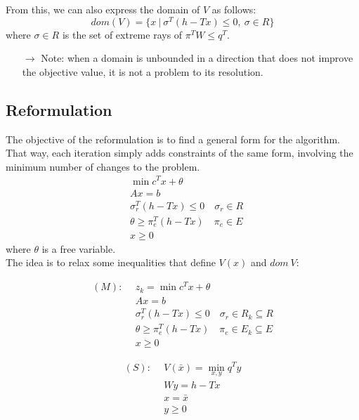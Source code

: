 \documentclass[12pt, openany]{report}
\theoremstyle{definition}
\begin{document}
From this, we can also express the domain of $V$ as follows:
\begin{equation}
	dom(V) = \{x\ |\ \sigma^T(h-Tx)\le 0,\ \sigma\in R\}
\end{equation}
where $\sigma\in R$ is the set of extreme rays of $\pi^TW\le q^T$.
\begin{itemize}
	\item [$\to$] Note: when a domain is unbounded in a direction that does not improve the objective value, it is not a problem to its resolution.
\end{itemize}
\subsection{Reformulation}
The objective of the reformulation is to find a general form for the algorithm. That way, each iteration simply adds constraints of the same form, involving the minimum number of changes to the problem.
\begin{equation}
	\begin{aligned}
		&\min c^Tx + \theta \\
		&Ax=b\\
		&\sigma_r^T(h-Tx)\le0\quad \sigma_r\in R\\
		&\theta \ge \pi_e^T(h-Tx)\quad \pi_e\in E\\
		&x\ge0 
 	\end{aligned}
\end{equation}
where $\theta$ is a free variable.\\
The idea is to relax some inequalities that define $V(x)$ and $dom\ V$:\\
\begin{minipage}{.5\textwidth}
	\begin{equation}
		\begin{aligned}
			(M): \ \ & z_k = \min c^Tx+\theta\\
			& Ax= b\\
			&\sigma_r^T(h-Tx)\le0\quad \sigma_r\in R_k\subseteq R\\
			&\theta \ge \pi_e^T(h-Tx)\quad \pi_e\in E_k\subseteq E\\
			&x\ge0 
		\end{aligned}
	\end{equation}
\end{minipage}
\begin{minipage}{.5\textwidth}
	\begin{equation}
		\begin{aligned}
			(S): \ \ & V(\bar x) = \min_{x,y} q^Ty\\
			& Wy=h-Tx\\
			&x = \bar x\\
			&y\ge 0
		\end{aligned}
	\end{equation}
\end{minipage}
\end{document}
